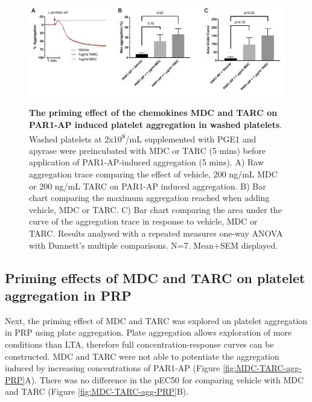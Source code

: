 \documentclass[11pt,twoside]{bristolthesis}
\begin{document}
\begin{figure}
\includegraphics[width=0.85\linewidth]{figure/Chemokines/Layouts/MDC_TARC_aggregation_PAR1} \caption[The priming effect of the chemokines MDC and TARC on PAR1-AP induced platelet aggregation in washed platelets]{\textbf{The priming effect of the chemokines MDC and TARC on PAR1-AP induced platelet aggregation in washed platelets}. Washed platelets at 2x10\textsuperscript{8}/mL supplemented with PGE1 and apyrase were preincubated with MDC or TARC (5 mins) before application of PAR1-AP-induced aggregation (5 mins). A) Raw aggregation trace comparing the effect of vehicle, 200 ng/mL MDC or 200 ng/mL TARC on PAR1-AP induced aggregation. B) Bar chart comparing the maximum aggregation reached when adding vehicle, MDC or TARC. C) Bar chart comparing the area under the curve of the aggregation trace in response to vehicle, MDC or TARC. Results analysed with a repeated measures one-way ANOVA with Dunnett's multiple comparisons. N=7. Mean+SEM displayed.}\label{fig:MDC-TARC-agg}
\end{figure}
\hypertarget{priming-effects-of-mdc-and-tarc-on-platelet-aggregation-in-prp}{%
\subsection{Priming effects of MDC and TARC on platelet aggregation in PRP}\label{priming-effects-of-mdc-and-tarc-on-platelet-aggregation-in-prp}}

Next, the priming effect of MDC and TARC was explored on platelet aggregation in PRP using plate aggregation. Plate aggregation allows exploration of more conditions than LTA, therefore full concentration-response curves can be constructed. MDC and TARC were not able to potentiate the aggregation induced by increasing concentrations of PAR1-AP (Figure \ref{fig:MDC-TARC-agg-PRP}A). There was no difference in the pEC50 for comparing vehicle with MDC and TARC (Figure \ref{fig:MDC-TARC-agg-PRP}B).
\end{document}
